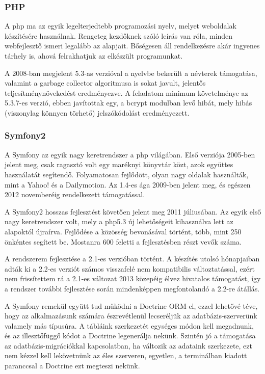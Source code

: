 \documentclass[a4paper,12pt,oneside]{report}
\begin{document}
\subsubsection{PHP}

A php ma az egyik legelterjedtebb programozási nyelv, melyet weboldalak készítésére használnak. Rengeteg kezdőknek szóló leírás van róla, minden webfejlesztő ismeri legalább az alapjait. Bőségesen áll rendelkezésre akár ingyenes tárhely is, ahová felrakhatjuk az elkészült programunkat.

A 2008-ban megjelent 5.3-as verzióval a nyelvbe bekerült a névterek támogatása, valamint a garbage collector algoritmusa is sokat javult, jelentős teljesítmény\-növe\-kedést eredményezve. A feladatom minimum követelménye az 5.3.7-es verzió, ebben javítottak egy, a bcrypt modulban levő hibát, mely hibás (viszonylag könnyen törhető) jelszókódolást eredményezett.

\subsubsection{Symfony2}

A Symfony az egyik nagy keretrendszer a php világában. Első verziója 2005-ben jelent meg\cite{book:gentle_introduction}, csak ragasztó volt egy maréknyi könyvtár közt, azok együttes használatát segítendő. Folyamatosan fejlődött, olyan nagy oldalak hasz\-nálták, mint a Yahoo!\cite{website:symfony_yahoo} és a Dailymotion\cite{website:symfony_dailymotion}. Az 1.4-es ága 2009-ben jelent meg, és egészen 2012 novemberéig rendelkezett támogatással.

A Symfony2 hosszas fejlesztést követően jelent meg 2011 júliusában. Az egyik első nagy keretrendszer volt, mely a php5.3 új lehetőségeit kihasználva lett az alapoktól újraírva. Fejlődése a közösség bevonásával történt, több, mint 250 önkéntes segített be. Mostanra 600 feletti a fejlesztésben részt vevők száma.

A rendszerem fejlesztése a 2.1-es verzióban történt. A készítés utolsó hónapjaiban adták ki a 2.2-es verziót számos visszafelé nem kompatibilis változtatással, ezért nem frissítettem rá \textendash{} a 2.1-es változat 2013 közepéig élvez hivatalos támogatást, így a rendszer további fejlesztése során mindenképpen megfontolandó a 2.2-re átállás.

A Symfony remekül együtt tud működni a Doctrine ORM-el\cite{website:doctrine,book:doctrine_orm}, ezzel lehetővé téve, hogy az alkalmazásunk számára észrevétlenül lecseréljük az adatbázis-szerverünk valamely más típusúra. A tábláink szerkezetét egységes módon kell megadnunk, és az illesztőfüggő kódot a Doctrine legenerálja nekünk. Szintén jó a támogatása az adatbázis-migrációkkal kapcsolatban, ha változik az adataink szerkezete, ezt nem kézzel kell lekövetnünk az éles szerveren, egyetlen, a terminálban kiadott paranccsal a Doctrine ezt megteszi nekünk.
\end{document}
